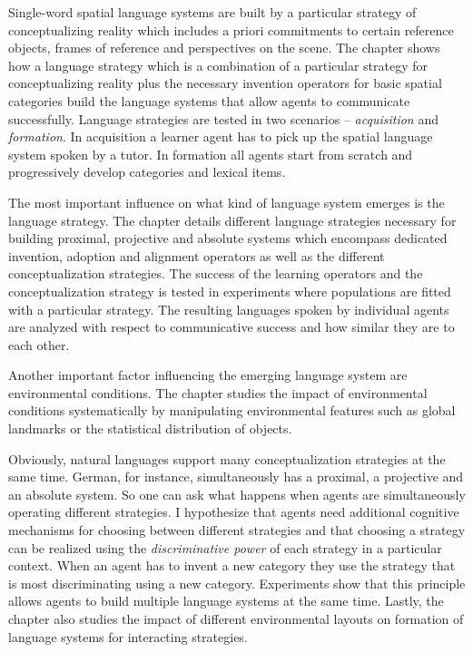 Single-word spatial language systems are built by a particular strategy of 
conceptualizing reality which includes a priori commitments to certain reference 
objects, frames of reference and perspectives on the scene. The chapter shows how a 
language strategy which is a combination of a particular strategy for conceptualizing reality 
plus the necessary invention operators for basic spatial categories build the language systems 
that allow agents to communicate successfully. Language strategies are tested in two 
scenarios -- \emph{acquisition} and \emph{formation}. In acquisition a learner agent has to pick 
up the spatial language system spoken by a tutor. In formation all agents start from scratch 
and progressively develop categories and lexical items.

The most important influence on what kind of language system emerges is the 
language strategy. The chapter details different language strategies 
necessary for building proximal, projective and absolute systems which encompass
dedicated invention, adoption and alignment operators as well as the different 
conceptualization strategies. The success of the learning operators and the 
conceptualization strategy is tested in experiments where populations are fitted with a 
particular strategy. The resulting languages spoken by individual agents are analyzed with 
respect to communicative success and how similar they are to each other. 

Another important factor influencing the emerging 
language system are environmental conditions. The chapter studies the impact of 
environmental conditions systematically by manipulating environmental features 
such as global landmarks or the statistical distribution of objects. 

Obviously, natural languages support many conceptualization strategies at the same time.
German, for instance, simultaneously has a proximal, a projective and an absolute system. 
So one can ask what happens when agents are simultaneously operating 
different strategies. I hypothesize that agents need additional cognitive mechanisms 
for choosing between different strategies and that choosing a strategy can be realized
using the \emph{discriminative power} of each strategy in a particular context. 
When an agent has to invent a new category they use the strategy that is most
discriminating using a new category. Experiments show that this principle
allows agents to build multiple language systems at the same time.
Lastly, the chapter also studies the impact of different environmental 
layouts on formation of language systems for interacting strategies.

